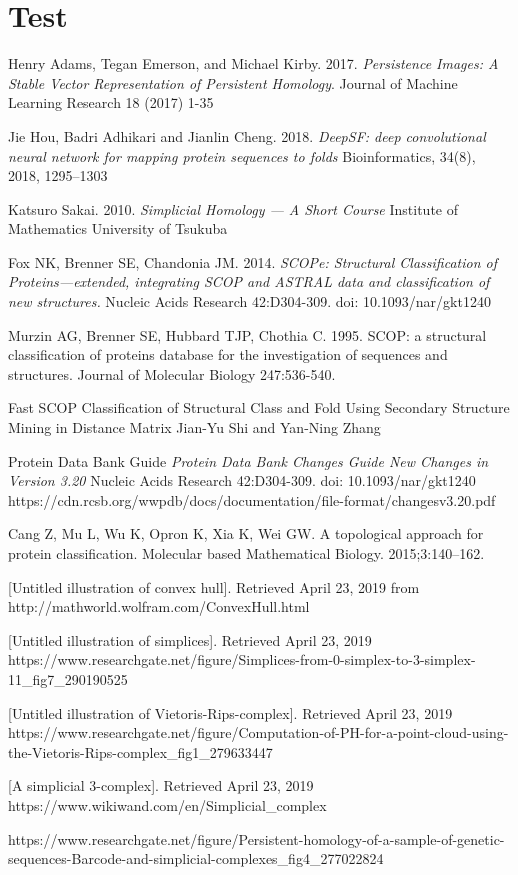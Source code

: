 \documentclass[12pt, a4paper, twocolumn, fullpage]{article}
\theoremstyle{plain}
\theoremstyle{definition}
\theoremstyle{remark}
\begin{document}
\section*{Test}
\begin{thebibliography}{9}
Henry Adams, Tegan Emerson, and Michael Kirby. 
2017.
\textit{Persistence Images: A Stable Vector Representation of
Persistent Homology}. 
Journal of Machine Learning Research 18 (2017) 1-35

Jie Hou, Badri Adhikari and Jianlin Cheng.
2018.
\textit{DeepSF: deep convolutional neural network for mapping protein sequences to folds}
Bioinformatics, 34(8), 2018, 1295–1303

Katsuro Sakai.
2010.
\textit{Simplicial Homology — A Short Course}
Institute of Mathematics University of Tsukuba

Fox NK, Brenner SE, Chandonia JM.
2014.
\textit{SCOPe: Structural Classification of Proteins—extended, integrating SCOP and ASTRAL data and classification of new structures.}
Nucleic Acids Research 42:D304-309. doi: 10.1093/nar/gkt1240

Murzin AG, Brenner SE, Hubbard TJP, Chothia C. 1995. SCOP: a structural classification of proteins database for the investigation of sequences and structures. Journal of Molecular Biology 247:536-540.

Fast SCOP Classification of Structural Class and Fold Using Secondary
Structure Mining in Distance Matrix
Jian-Yu Shi and Yan-Ning Zhang

Protein Data Bank Guide
\textit{Protein Data Bank Changes Guide
    New Changes in Version 3.20}
Nucleic Acids Research 42:D304-309. doi: 10.1093/nar/gkt1240
https://cdn.rcsb.org/wwpdb/docs/documentation/file-format/changesv3.20.pdf

Cang Z, Mu L, Wu K, Opron K, Xia K, Wei GW. A topological approach for protein classification. Molecular based Mathematical Biology. 2015;3:140–162.


[Untitled illustration of convex hull]. Retrieved April 23, 2019
             from http://mathworld.wolfram.com/ConvexHull.html
             
[Untitled illustration of simplices]. Retrieved April 23, 2019
https://www.researchgate.net/figure/Simplices-from-0-simplex-to-3-simplex-11\_fig7\_290190525

[Untitled illustration of Vietoris-Rips-complex]. Retrieved April 23, 2019
https://www.researchgate.net/figure/Computation-of-PH-for-a-point-cloud-using-the-Vietoris-Rips-complex\_fig1\_279633447

[A simplicial 3-complex]. Retrieved April 23, 2019 https://www.wikiwand.com/en/Simplicial\_complex

https://www.researchgate.net/figure/Persistent-homology-of-a-sample-of-genetic-sequences-Barcode-and-simplicial-complexes\_fig4\_277022824
\end{thebibliography}
\end{document}
